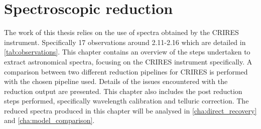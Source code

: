 
\chapter{Spectroscopic reduction} %
\label{cha:reduction}

The work of this thesis relies on the use of \nir{} spectra obtained by the {CRIRES} instrument. Specifically 17 observations around 2.11-2.16\um{} which are detailed in \cref{tab:observations}.
This chapter contains an overview of the steps undertaken to extract astronomical spectra, focusing on the {CRIRES} instrument specifically.
A comparison between two different reduction pipelines for {CRIRES} is performed with the chosen pipeline used.
Details of the issues encountered with the reduction output are presented.
This chapter also includes the post reduction steps performed, specifically wavelength calibration and telluric correction.
The reduced spectra produced in this chapter will be analysed in \cref{cha:direct_recovery} and \cref{cha:model_comparison}.


